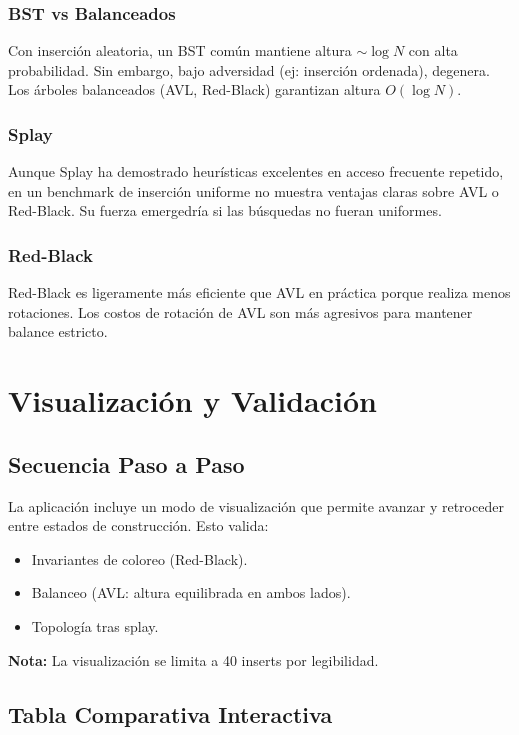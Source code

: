 \documentclass[12pt,a4paper]{article}
\begin{document}
\subsubsection{BST vs Balanceados}

Con inserción aleatoria, un BST común mantiene altura $\sim \log N$ con alta probabilidad. Sin embargo, bajo adversidad (ej: inserción ordenada), degenera. Los árboles balanceados (AVL, Red-Black) garantizan altura $O(\log N)$.

\subsubsection{Splay}

Aunque Splay ha demostrado heurísticas excelentes en acceso frecuente repetido, en un benchmark de inserción uniforme no muestra ventajas claras sobre AVL o Red-Black. Su fuerza emergedría si las búsquedas no fueran uniformes.

\subsubsection{Red-Black}

Red-Black es ligeramente más eficiente que AVL en práctica porque realiza menos rotaciones. Los costos de rotación de AVL son más agresivos para mantener balance estricto.

\section{Visualización y Validación}

\subsection{Secuencia Paso a Paso}

La aplicación incluye un modo de visualización que permite avanzar y retroceder entre estados de construcción. Esto valida:
\begin{itemize}
    \item Invariantes de coloreo (Red-Black).
    \item Balanceo (AVL: altura equilibrada en ambos lados).
    \item Topología tras splay.
\end{itemize}

\textbf{Nota:} La visualización se limita a 40 inserts por legibilidad.

\subsection{Tabla Comparativa Interactiva}
\end{document}
